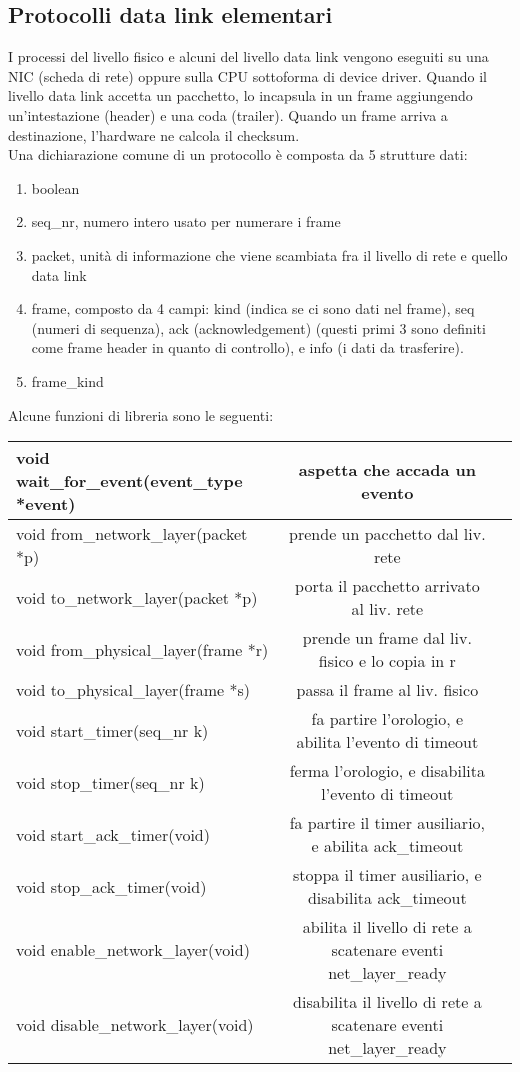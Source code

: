 \documentclass{article}
\begin{document}
\subsection{Protocolli data link elementari}
I processi del livello fisico e alcuni del livello data link vengono eseguiti su una NIC (scheda di rete) oppure sulla CPU sottoforma di device driver. Quando il livello data link accetta un pacchetto, lo incapsula in un frame aggiungendo un'intestazione (header) e una coda (trailer). Quando un frame arriva a destinazione, l'hardware ne calcola il checksum. \\
Una dichiarazione comune di un protocollo è composta da 5 strutture dati:
\begin{enumerate}
\item boolean
\item seq\_nr, numero intero usato per numerare i frame
\item packet, unità di informazione che viene scambiata fra il livello di rete e quello data link
\item frame, composto da 4 campi: kind (indica se ci sono dati nel frame), seq (numeri di sequenza), ack (acknowledgement) (questi primi 3 sono definiti come frame header in quanto di controllo), e info (i dati da trasferire). 
\item frame\_kind
\end{enumerate}
Alcune funzioni di libreria sono le seguenti:\\
\begin{tabular}{|l | c | r}
	\hline
	void wait\_for\_event(event\_type *event) & aspetta che accada un evento \\ \hline
	void from\_network\_layer(packet *p) & prende un pacchetto dal liv. rete\\ \hline
	void to\_network\_layer(packet *p) & porta il pacchetto arrivato al liv. rete \\ \hline
	void from\_physical\_layer(frame *r) & prende un frame dal liv. fisico e lo copia in r \\ \hline
	void to\_physical\_layer(frame *s) & passa il frame al liv. fisico \\ \hline
	void start\_timer(seq\_nr k) & fa partire l'orologio, e abilita l'evento di timeout \\ \hline
	void stop\_timer(seq\_nr k) & ferma l'orologio, e disabilita l'evento di timeout \\ \hline
	void start\_ack\_timer(void) & fa partire il timer ausiliario, e abilita ack\_timeout \\ \hline
	void stop\_ack\_timer(void) & stoppa il timer ausiliario, e disabilita ack\_timeout \\ \hline
	void enable\_network\_layer(void) & abilita il livello di rete a scatenare eventi net\_layer\_ready \\ \hline
	void disable\_network\_layer(void) & disabilita il livello di rete a scatenare eventi net\_layer\_ready \\ \hline
\end{tabular}
\end{document}
